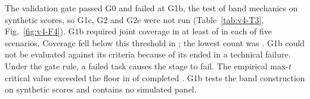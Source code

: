 The validation gate passed G0 and failed at G1b, the test of band mechanics on synthetic scores, so G1c, G2 and G2c were not run (Table~\ref{tab:v4-T3}, Fig.~\ref{fig:v4-F4}). %
G1b required joint coverage in at least  of   in each of five scenarios. Coverage fell below this threshold in  ; the lowest count was . %
G1b could not be evaluated against its criteria because  of its   ended in a technical failure. Under the gate rule, a failed task causes the stage to fail. %
The empirical max-$t$ critical value exceeded the  floor in  of  completed . %
G1b tests the band construction on synthetic scores and contains no simulated panel. %


